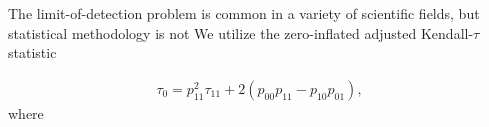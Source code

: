 The limit-of-detection problem is common in a variety of scientific fields, but statistical methodology is not 
We utilize the zero-inflated adjusted Kendall-$\tau$ statistic

\begin{align*}
    \tau_0 = p_{11}^2 \tau_11 + 2(p_{00} p_{11} - p_{10} p_{01}),
\end{align*}
where \citep{Pimentel2009KendallsTA, Albasi2018-iv}




















